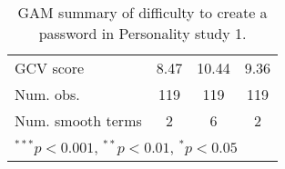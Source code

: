 \begin{table}[!h]
\begin{center}
{\begin{tabular}{l c c c }
GCV score                 & 8.47         & 10.44        & 9.36       \\
Num. obs.                 & 119          & 119          & 119        \\
Num. smooth terms         & 2            & 6            & 2          \\
\hline
\multicolumn{4}{l}{\scriptsize{$^{***}p<0.001$, $^{**}p<0.01$, $^*p<0.05$}}
\end{tabular}}
\caption{GAM summary of difficulty to create a password in Personality study 1.}
\label{table:coefficients}
\end{center}
\end{table}